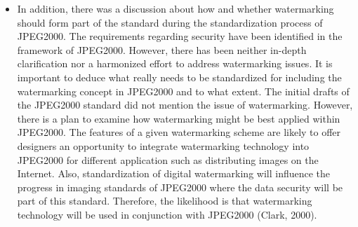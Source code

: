 \documentclass[12pt]{IEEEtran}
\begin{document}
\begin{enumerate}
\begin{itemize}
\item In addition, there was a discussion about how and whether watermarking should form part of the standard during the standardization process of JPEG2000. The requirements regarding security have been identified in the framework of JPEG2000. However, there has been neither in-depth clarification nor a harmonized effort to address watermarking issues. It is important to deduce what really needs to be standardized for including the watermarking concept in JPEG2000 and to what extent. The initial drafts of the JPEG2000 standard did not mention the issue of watermarking. However, there is a plan to examine how watermarking might be best applied within JPEG2000. The features of a given watermarking scheme are likely to offer designers an opportunity to integrate watermarking technology into JPEG2000 for different application such as distributing images on the Internet. Also, standardization of digital watermarking will influence the progress in imaging standards of JPEG2000 where the data security will be part of this standard. Therefore, the likelihood is that watermarking technology will be used in conjunction with JPEG2000 (Clark, 2000).
\end{itemize}

\end{enumerate}
\end{document}
